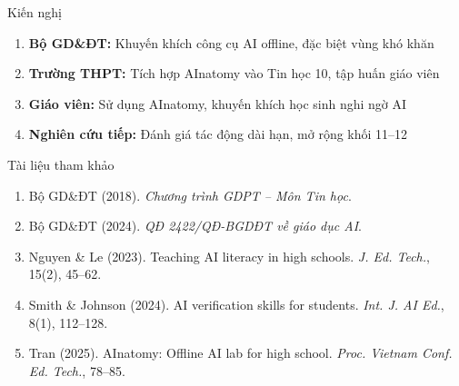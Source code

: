 \documentclass[10pt,xcolor=dvipsnames]{beamer}
\begin{document}
\begin{frame}{Kiến nghị}
  \begin{enumerate}
    \item \textbf{Bộ GD\&ĐT:} Khuyến khích công cụ AI offline, đặc biệt vùng khó khăn
    \item \textbf{Trường THPT:} Tích hợp AInatomy vào Tin học 10, tập huấn giáo viên
    \item \textbf{Giáo viên:} Sử dụng AInatomy, khuyến khích học sinh nghi ngờ AI
    \item \textbf{Nghiên cứu tiếp:} Đánh giá tác động dài hạn, mở rộng khối 11--12
  \end{enumerate}
\end{frame}

\begin{frame}{Tài liệu tham khảo}
  \small
  \begin{enumerate}
    \item Bộ GD\&ĐT (2018). \textit{Chương trình GDPT -- Môn Tin học}.
    \item Bộ GD\&ĐT (2024). \textit{QĐ 2422/QĐ-BGDĐT về giáo dục AI}.
    \item Nguyen \& Le (2023). Teaching AI literacy in high schools. \textit{J. Ed. Tech.}, 15(2), 45--62.
    \item Smith \& Johnson (2024). AI verification skills for students. \textit{Int. J. AI Ed.}, 8(1), 112--128.
    \item Tran (2025). AInatomy: Offline AI lab for high school. \textit{Proc. Vietnam Conf. Ed. Tech.}, 78--85.
  \end{enumerate}
\end{frame}
\end{document}
